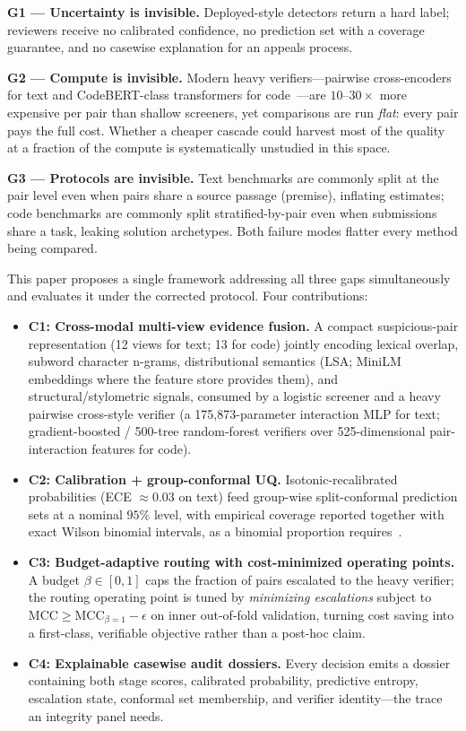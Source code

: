\documentclass[conference]{IEEEtran}
\newcommand{\mcc}{\mathrm{MCC}}
\begin{document}
\textbf{G1 --- Uncertainty is invisible.} Deployed-style detectors return a hard label; reviewers
receive no calibrated confidence, no prediction set with a coverage guarantee, and no casewise
explanation for an appeals process.

\textbf{G2 --- Compute is invisible.} Modern heavy verifiers---pairwise cross-encoders for text
and CodeBERT-class transformers for code~\cite{reimers2019,feng2020}---are $10$--$30\times$ more
expensive per pair than shallow screeners, yet comparisons are run \emph{flat}: every pair pays the
full cost. Whether a cheaper cascade could harvest most of the quality at a fraction of the compute
is systematically unstudied in this space.

\textbf{G3 --- Protocols are invisible.} Text benchmarks are commonly split at the pair level even
when pairs share a source passage (premise), inflating estimates; code benchmarks are commonly
split stratified-by-pair even when submissions share a task, leaking solution archetypes. Both
failure modes flatter every method being compared.

This paper proposes a single framework addressing all three gaps simultaneously and evaluates it
under the corrected protocol. Four contributions:

\begin{itemize}[leftmargin=1.6em]
\item \textbf{C1: Cross-modal multi-view evidence fusion.} A compact suspicious-pair representation
  (12 views for text; 13 for code) jointly encoding lexical overlap, subword character n-grams,
  distributional semantics (LSA; MiniLM embeddings where the feature store provides them), and
  structural/stylometric signals, consumed by a logistic screener and a heavy pairwise
  cross-style verifier (a 175{,}873-parameter interaction MLP for text; gradient-boosted /
  500-tree random-forest verifiers over 525-dimensional pair-interaction features for code).
\item \textbf{C2: Calibration + group-conformal UQ.} Isotonic-recalibrated probabilities
  (ECE $\approx 0.03$ on text) feed group-wise split-conformal prediction sets at a nominal $95\%$
  level, with empirical coverage reported together with exact Wilson binomial intervals, as a binomial
  proportion requires~\cite{vovk2005,angelopoulos2021}.
\item \textbf{C3: Budget-adaptive routing with cost-minimized operating points.} A budget
  $\beta \in [0,1]$ caps the fraction of pairs escalated to the heavy verifier; the routing
  operating point is tuned by \emph{minimizing escalations} subject to
  $\mcc \geq \mcc_{\beta=1} - \epsilon$ on inner out-of-fold validation, turning cost saving into a
  first-class, verifiable objective rather than a post-hoc claim.
\item \textbf{C4: Explainable casewise audit dossiers.} Every decision emits a dossier containing
  both stage scores, calibrated probability, predictive entropy, escalation state, conformal set
  membership, and verifier identity---the trace an integrity panel needs.
\end{itemize}
\end{document}
